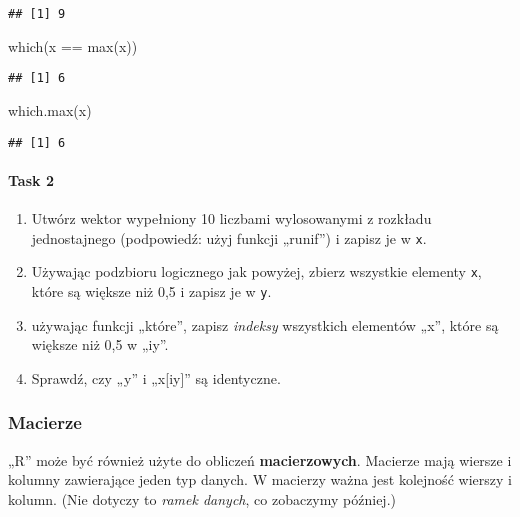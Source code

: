 \documentclass[
]{article}
\newenvironment{Shaded}{\begin{snugshade}}{\end{snugshade}}
\newcommand{\FunctionTok}[1]{\textcolor[rgb]{0.00,0.00,0.00}{#1}}
\newcommand{\NormalTok}[1]{#1}
\newcommand{\SpecialCharTok}[1]{\textcolor[rgb]{0.00,0.00,0.00}{#1}}
\providecommand{\tightlist}{%
  \setlength{\itemsep}{0pt}\setlength{\parskip}{0pt}}
\begin{document}
\begin{verbatim}
## [1] 9
\end{verbatim}

\begin{Shaded}
\begin{Highlighting}[]
\FunctionTok{which}\NormalTok{(x }\SpecialCharTok{==} \FunctionTok{max}\NormalTok{(x))}
\end{Highlighting}
\end{Shaded}

\begin{verbatim}
## [1] 6
\end{verbatim}

\begin{Shaded}
\begin{Highlighting}[]
\FunctionTok{which.max}\NormalTok{(x)}
\end{Highlighting}
\end{Shaded}

\begin{verbatim}
## [1] 6
\end{verbatim}

\hypertarget{task-2}{%
\paragraph{Task 2}\label{task-2}}

\begin{enumerate}
\def\labelenumi{\arabic{enumi}.}
\tightlist
\item
  Utwórz wektor wypełniony 10 liczbami wylosowanymi z rozkładu
  jednostajnego (podpowiedź: użyj funkcji „runif'') i zapisz je w
  \texttt{x}.
\item
  Używając podzbioru logicznego jak powyżej, zbierz wszystkie elementy
  \texttt{x}, które są większe niż 0,5 i zapisz je w \texttt{y}.
\item
  używając funkcji „które'', zapisz \emph{indeksy} wszystkich elementów
  „x'', które są większe niż 0,5 w „iy''.
\item
  Sprawdź, czy „y'' i „x{[}iy{]}'' są identyczne.
\end{enumerate}

\hypertarget{macierze}{%
\subsubsection{Macierze}\label{macierze}}

„R'' może być również użyte do obliczeń \textbf{macierzowych}. Macierze
mają wiersze i kolumny zawierające jeden typ danych. W macierzy ważna
jest kolejność wierszy i kolumn. (Nie dotyczy to \emph{ramek danych}, co
zobaczymy później.)
\end{document}
